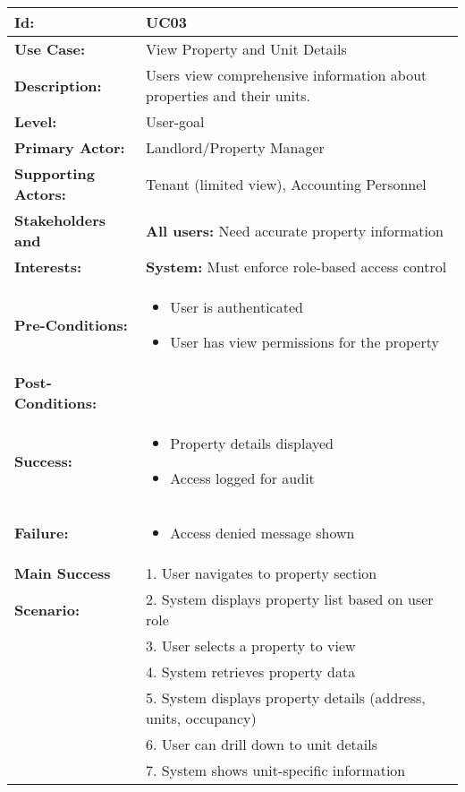 \documentclass[12pt]{article}
\begin{document}
\begin{tabular}{|p{3cm}|p{11cm}|}
\hline
\textbf{Id:} & UC03 \\
\hline
\textbf{Use Case:} & View Property and Unit Details \\
\hline
\textbf{Description:} & Users view comprehensive information about properties and their units. \\
\hline
\textbf{Level:} & User-goal \\
\hline
\textbf{Primary Actor:} & Landlord/Property Manager \\
\hline
\textbf{Supporting Actors:} & Tenant (limited view), Accounting Personnel \\
\hline
\textbf{Stakeholders and} & \textbf{All users:} Need accurate property information \\
\textbf{Interests:} & \textbf{System:} Must enforce role-based access control \\
\hline
\textbf{Pre-Conditions:} & 
\begin{itemize}
    \item User is authenticated
    \item User has view permissions for the property
\end{itemize} \\
\hline
\textbf{Post-Conditions:} & \\
\textbf{Success:} & 
\begin{itemize}
    \item Property details displayed
    \item Access logged for audit
\end{itemize} \\
\textbf{Failure:} & 
\begin{itemize}
    \item Access denied message shown
\end{itemize} \\
\hline
\textbf{Main Success} & 1. User navigates to property section \\
\textbf{Scenario:} & 2. System displays property list based on user role \\
& 3. User selects a property to view \\
& 4. System retrieves property data \\
& 5. System displays property details (address, units, occupancy) \\
& 6. User can drill down to unit details \\
& 7. System shows unit-specific information \\

\end{tabular}
\end{document}
